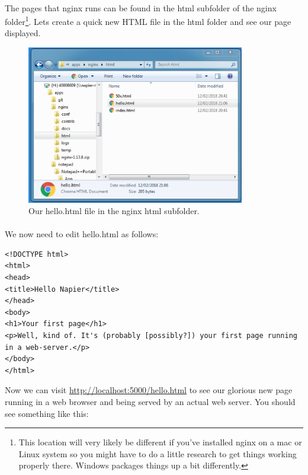 \documentclass[10pt, a4paper, twosize]{article}
\begin{document}
\paragraph{} The pages that nginx runs can be found in the html subfolder of the nginx folder\footnote{This location will very likely be different if you've installed nginx on a mac or Linux system so you might have to do a little research to get things working properly there. Windows packages things up a bit differently.}. Lets create a quick new HTML file in the html folder and see our page displayed. 

\begin{figure}[H]
\centering
\includegraphics[width=0.85\textwidth]{images/nginx_html}
\caption{Our hello.html file in the nginx html subfolder.}
\label{fig:nginx_welcome}
\end{figure}


\paragraph{} We now need to edit hello.html as follows:

\begin{lstlisting}
<!DOCTYPE html>
<html>
<head>
<title>Hello Napier</title>
</head>
<body>
<h1>Your first page</h1>
<p>Well, kind of. It's (probably [possibly?]) your first page running in a web-server.</p>
</body>
</html>
\end{lstlisting}

Now we can visit \url{http://localhost:5000/hello.html} to see our glorious new page running in a web browser and being served by an actual web server. You should see something like this:
\end{document}
